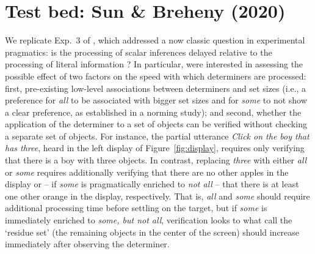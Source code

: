 \documentclass[10pt,letterpaper]{article}
\newcommand{\figref}[1]{Figure~\ref{#1}}
\newcommand{\expref}[1]{Exp.~#1}
\begin{document}
\section{Test bed: Sun \& Breheny (2020)}

We replicate \expref{3} of , which addressed a now classic question in experimental pragmatics: is the processing of scalar inferences delayed relative to the processing of literal information \cite{bott2004, Breheny2006, huang2009, grodner2010, DegenTanenhaus2015, DegenT2016, Tomlinson2013}? In particular,   were interested in assessing the possible effect of two factors on the speed with which determiners are processed: first, pre-existing low-level associations between determiners and set sizes (i.e., a preference for \emph{all} to be associated with bigger set sizes and for \emph{some} to not show a clear preference, as established in a norming study); and second, whether the application of the determiner to a set of objects can be verified without checking a separate set of objects. For instance, the partial utterance \emph{Click on the boy that has three}, heard in the left display of \figref{fig:display}, requires only verifying that there is a boy with three objects. In contrast, replacing \emph{three} with either \emph{all} or \emph{some} requires additionally verifying that there are no other apples in the display or -- if \emph{some} is pragmatically enriched to \emph{not all} --  that there is at least one other orange in the display, respectively. That is, \emph{all} and \emph{some} should require additional processing time before settling on the target, but if \emph{some} is immediately enriched to \emph{some, but not all}, verification looks to what  call the `residue set' (the remaining objects in the center of the screen) should increase immediately after observing the determiner. 
\end{document}
